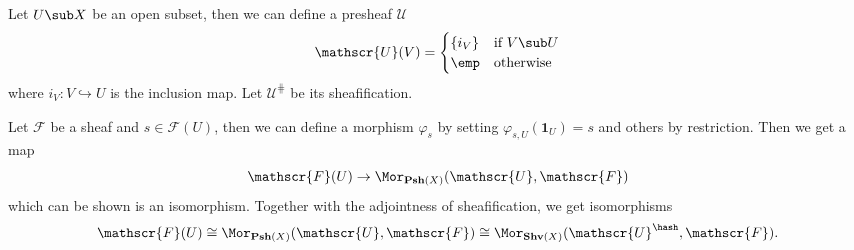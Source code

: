 \begin{example}\label{sheaf by open subset}
Let $U\sub X$ be an open subset, then we can define a presheaf $\mathscr{U}$
\[\mathscr{U}(V)=\begin{cases}
\{i_V\}&\text{if }V\sub U\\
\emp&\text{otherwise}
\end{cases}\]
where $i_V:V\hookrightarrow U$ is the inclusion map. Let $\mathscr{U}^{\hash}$ be its sheafification.\par
Let $\mathscr{F}$ be a sheaf and $s\in\mathscr{F}(U)$, then we can define a morphism $\varphi_s$ by setting $\varphi_{s,U}(\mathbf{1}_U)=s$ and others by restriction. Then we get a map
\[\mathscr{F}(U)\to\Mor_{\mathbf{Psh}(X)}(\mathscr{U},\mathscr{F})\]
which can be shown is an isomorphism. Together with the adjointness of sheafification, we get isomorphisms
\[\mathscr{F}(U)\cong\Mor_{\mathbf{Psh}(X)}(\mathscr{U},\mathscr{F})\cong\Mor_{\mathbf{Shv}(X)}(\mathscr{U}^{\hash},\mathscr{F}).\]
\end{example}
